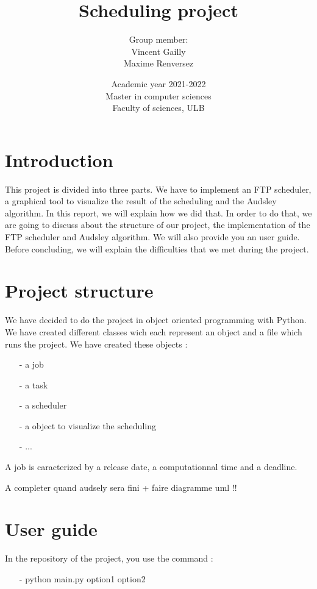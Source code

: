 \documentclass[a4paper,12pt]{article}
\title{
{\Huge Scheduling project}\\
\smallskip
}
\author{
Group member:\\
Vincent Gailly\\
Maxime Renversez
\smallskip
}
\date{ Academic year 2021-2022\\
Master in computer sciences \\
\vspace{1cm}
Faculty of sciences, ULB}
\begin{document}
\maketitle
\newpage
\tableofcontents
\newpage

\section{Introduction}

This project is divided into three parts. We have to implement an FTP scheduler, a graphical tool to visualize the result of the scheduling and the Audsley algorithm. In this report, we will explain how we did that. In order to do that, we are going to discuss about the structure of our project, the implementation of the FTP scheduler and Audsley algorithm. We will also provide you an user guide. Before concluding, we will explain the difficulties that we met during the project.      

\newpage

\section{Project structure}

We have decided to do the project in object oriented programming with Python. We have created different classes wich each represent an object and a file which runs the project. We have created these objects : \\
\begin{itemize}
\item[-] a job 
\item[-] a task 
\item[-] a scheduler 
\item[-] a object  to visualize the scheduling 
\item[-] ...
\end{itemize}

\smallskip
\noindent
A job is caracterized by a release date, a computationnal time and a deadline. 

\smallskip 
A completer quand audsely sera fini  + faire diagramme uml !! 

\newpage

\section{User guide}

In the repository of the project, you use the command : \\
\begin{itemize}
\item[-] python main.py option1 option2
\end{itemize}
\end{document}
